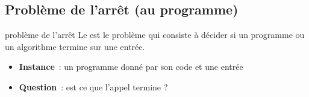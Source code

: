 \subsection{Problème de l'arrêt (au programme)}

\begin{definition}{}{problème de l'arrêt}
    Le  est le problème qui consiste à décider si un programme ou un algorithme termine sur une entrée.
    \begin{itemize}
        \item \textbf{Instance}~: un programme  donné par son code  et une entrée 
        \item \textbf{Question}~: est ce que l'appel  termine ?
    \end{itemize}
\end{definition}

